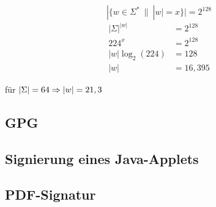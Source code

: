 	\[ | \{ w \in \Sigma^*  ~ \| ~ |w| = x \} | = 2^{128} \]
\begin{align}
		|\Sigma|^{|w|} &= 2^{128} \\ 
		224^x        &= 2^{128} \\
		|w|\log_2(224) &= 128 \\
		|w|            &=  16,395
\end{align}	

für $|\Sigma| = 64 \Rightarrow |w| = 21,3 $

\subsection{GPG}
\subsection{Signierung eines Java-Applets}
\subsection{PDF-Signatur}


